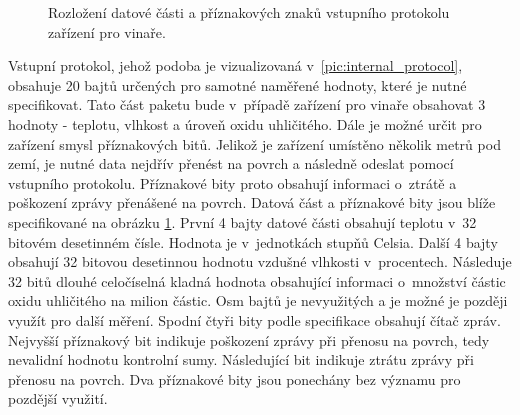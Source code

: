 \begin{figure}[h]
  \centering
  
  \caption{Rozložení datové části a příznakových znaků vstupního protokolu zařízení pro vinaře.}
  \label{pic:cellar_data_packet}
\end{figure}

Vstupní protokol, jehož podoba je vizualizovaná v~\ref{pic:internal_protocol}, obsahuje 20 bajtů určených pro samotné naměřené hodnoty, které je nutné specifikovat. Tato část paketu bude v~případě zařízení pro vinaře obsahovat 3 hodnoty - teplotu, vlhkost a úroveň oxidu uhličitého. Dále je možné určit pro zařízení smysl příznakových bitů. Jelikož je zařízení umístěno několik metrů pod zemí, je nutné data nejdřív přenést na povrch a následně odeslat pomocí vstupního protokolu. Příznakové bity proto obsahují informaci o~ztrátě a poškození zprávy přenášené na povrch. Datová část a příznakové bity jsou blíže specifikované na obrázku \ref{pic:cellar_data_packet}. První 4 bajty datové části obsahují teplotu v~32 bitovém desetinném čísle. Hodnota je v~jednotkách stupňů Celsia. Další 4 bajty obsahují 32 bitovou desetinnou hodnotu vzdušné vlhkosti v~procentech. Následuje 32 bitů dlouhé celočíselná kladná hodnota obsahující informaci o~množství částic oxidu uhličitého na milion částic. Osm bajtů je nevyužitých a je možné je později využít pro další měření. Spodní čtyři bity podle specifikace obsahují čítač zpráv. Nejvyšší příznakový bit indikuje poškození zprávy při přenosu na povrch, tedy nevalidní hodnotu kontrolní sumy. Následující bit indikuje ztrátu zprávy při přenosu na povrch. Dva příznakové bity jsou ponechány bez významu pro pozdější využití.

